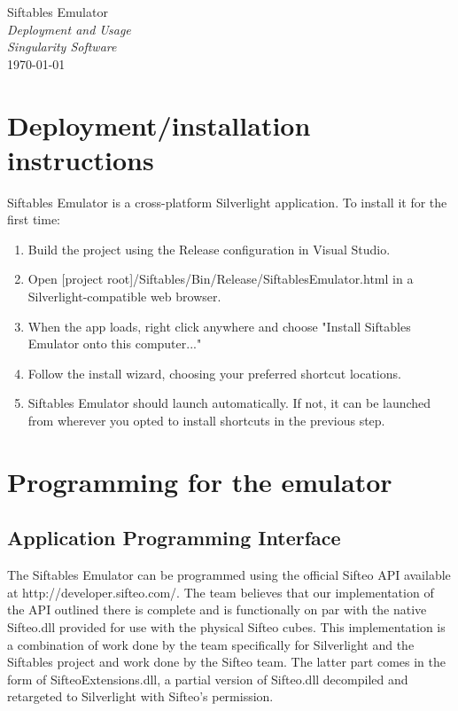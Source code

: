 \documentclass[12pt]{article}
\begin{document}
\begin{center}
	\LARGE{Siftables Emulator} \\
	\LARGE{\textit{Deployment and Usage}}\\
	\Large{\textit{Singularity Software}} \\
	\vspace{.05in}
	\normalsize{\today} \\
\end{center}

\section{Deployment/installation instructions}
Siftables Emulator is a cross-platform Silverlight application. To install it for the first time:
\begin{enumerate}
\item Build the project using the Release configuration in Visual Studio.
\item Open [project root]/Siftables/Bin/Release/SiftablesEmulator.html in a Silverlight-compatible web browser.
\item When the app loads, right click anywhere and choose "Install Siftables Emulator onto this computer..."
\item Follow the install wizard, choosing your preferred shortcut locations.
\item Siftables Emulator should launch automatically. If not, it can be launched from wherever you opted to install shortcuts in the previous step.
\end{enumerate}

\section{Programming for the emulator}
\subsection{Application Programming Interface}
The Siftables Emulator can be programmed using the official Sifteo API available at http://developer.sifteo.com/. The team believes that our implementation of the API outlined there is complete and is functionally on par with the native Sifteo.dll provided for use with the physical Sifteo cubes. This implementation is a combination of work done by the team specifically for Silverlight and the Siftables project and work done by the Sifteo team. The latter part comes in the form of SifteoExtensions.dll, a partial version of Sifteo.dll decompiled and retargeted to Silverlight with Sifteo's permission.
\end{document}

